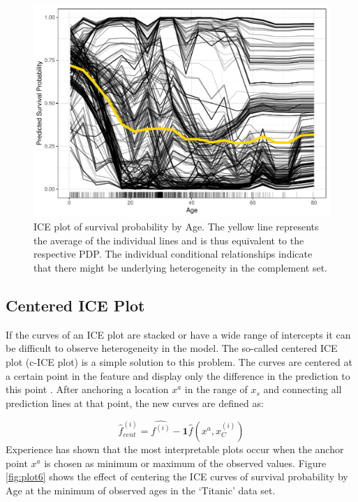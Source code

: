 \documentclass[]{krantz}
\begin{document}
\begin{figure}

{\centering \includegraphics[width=0.8\linewidth]{images/PDP_Plot_5} 

}

\caption{ICE plot of survival probability by Age. The yellow line represents the average of the individual lines and is thus equivalent to the respective PDP. The individual conditional relationships indicate that there might be underlying heterogeneity in the complement set.}\label{fig:plot5}
\end{figure}

\subsection{Centered ICE Plot}\label{centered-ice-plot}

If the curves of an ICE plot are stacked or have a wide range of
intercepts it can be difficult to observe heterogeneity in the model.
The so-called centered ICE plot (c-ICE plot) is a simple solution to
this problem. The curves are centered at a certain point in the feature
and display only the difference in the prediction to this point
\citep{molnar2019}. After anchoring a location \(x^a\) in the range of
\(x_s\) and connecting all prediction lines at that point, the new
curves are defined as:

\[\hat{f}^{(i)}_{cent} = \hat{f^{(i)}} - \mathbf{1}\hat{f}(x^a,x^{(i)}_C)\]
Experience has shown that the most interpretable plots occur when the
anchor point \(x^a\) is chosen as minimum or maximum of the observed
values. Figure \ref{fig:plot6} shows the effect of centering the ICE
curves of survival probability by Age at the minimum of observed ages in
the `Titanic' data set.
\end{document}
